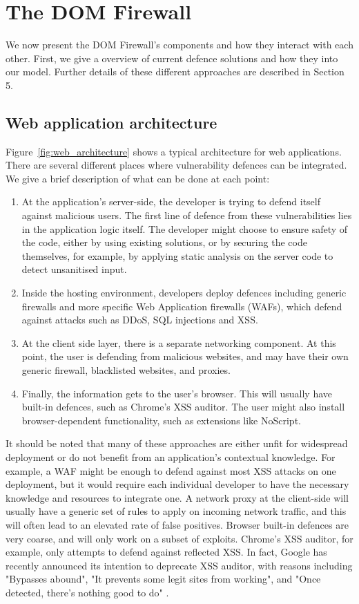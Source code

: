\section{The DOM Firewall}

We now present the DOM Firewall's components and how they interact with each other. First, we give a overview of current defence solutions and how they into our model. Further details of these different approaches are described in Section 5.

\subsection{Web application architecture}
Figure~\ref{fig:web_architecture} shows a typical architecture for web applications. There are several different places where vulnerability defences can be integrated. We give a brief description of what can be done at each point:
\begin{enumerate}
	\item  At the application's server-side, the developer is trying to defend itself against malicious users. The first line of defence from these vulnerabilities lies in the application logic itself. The developer might choose to ensure safety of the code, either by using existing solutions, or by securing the code themselves, for example, by applying static analysis on the server code to detect unsanitised input.
	\item Inside the hosting environment, developers deploy defences including generic firewalls and more specific Web Application firewalls (WAFs), which defend against  attacks such as DDoS, SQL injections and XSS.
	\item At the client side layer, there is a separate networking component. At this point, the user is defending from malicious websites, and may have their own generic firewall, blacklisted websites, and proxies. 
	\item Finally, the information gets to the user's browser. This will usually have built-in defences, such as Chrome's XSS auditor. The user might also install browser-dependent functionality, such as extensions like NoScript.
\end{enumerate}

It should be noted that many of these approaches are either unfit for widespread deployment or do not benefit from an application's contextual knowledge. For example, a WAF might be enough to defend against most XSS attacks on one deployment, but it would require each individual developer to have the necessary knowledge and resources to integrate one. A network proxy at the client-side will usually have a generic set of rules to apply on incoming network traffic, and this will often lead to an elevated rate of false positives. Browser built-in defences are very coarse, and will only work on a subset of exploits. Chrome's XSS auditor, for example, only attempts to defend against reflected XSS. In fact, Google has recently announced its intention to deprecate XSS auditor, with reasons including "Bypasses abound", "It prevents some legit sites from working", and "Once detected, there’s nothing good to do" \cite{deprecatexssauditor}.

